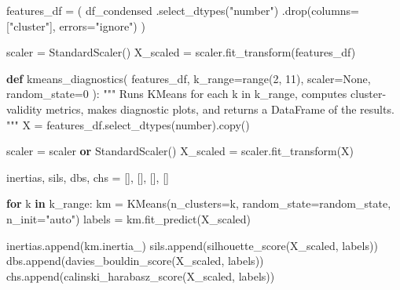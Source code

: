 \documentclass[
  letterpaper,
  DIV=11,
  numbers=noendperiod]{scrreprt}
\newenvironment{Shaded}{\begin{snugshade}}{\end{snugshade}}
\newcommand{\BuiltInTok}[1]{\textcolor[rgb]{0.00,0.23,0.31}{#1}}
\newcommand{\CommentTok}[1]{\textcolor[rgb]{0.37,0.37,0.37}{#1}}
\newcommand{\ControlFlowTok}[1]{\textcolor[rgb]{0.00,0.23,0.31}{\textbf{#1}}}
\newcommand{\DecValTok}[1]{\textcolor[rgb]{0.68,0.00,0.00}{#1}}
\newcommand{\KeywordTok}[1]{\textcolor[rgb]{0.00,0.23,0.31}{\textbf{#1}}}
\newcommand{\NormalTok}[1]{\textcolor[rgb]{0.00,0.23,0.31}{#1}}
\newcommand{\OperatorTok}[1]{\textcolor[rgb]{0.37,0.37,0.37}{#1}}
\newcommand{\StringTok}[1]{\textcolor[rgb]{0.13,0.47,0.30}{#1}}
\newcommand{\VariableTok}[1]{\textcolor[rgb]{0.07,0.07,0.07}{#1}}
\begin{document}
\begin{Shaded}
\begin{Highlighting}[]
\NormalTok{features\_df }\OperatorTok{=}\NormalTok{ (}
\NormalTok{    df\_condensed}
\NormalTok{    .select\_dtypes(}\StringTok{"number"}\NormalTok{)}
\NormalTok{    .drop(columns}\OperatorTok{=}\NormalTok{[}\StringTok{"cluster"}\NormalTok{], errors}\OperatorTok{=}\StringTok{"ignore"}\NormalTok{)}
\NormalTok{)}

\NormalTok{scaler }\OperatorTok{=}\NormalTok{ StandardScaler()}
\NormalTok{X\_scaled }\OperatorTok{=}\NormalTok{ scaler.fit\_transform(features\_df)}
\end{Highlighting}
\end{Shaded}

\begin{Shaded}
\begin{Highlighting}[]
\KeywordTok{def}\NormalTok{ kmeans\_diagnostics(}
\NormalTok{        features\_df,}
\NormalTok{        k\_range}\OperatorTok{=}\BuiltInTok{range}\NormalTok{(}\DecValTok{2}\NormalTok{, }\DecValTok{11}\NormalTok{),}
\NormalTok{        scaler}\OperatorTok{=}\VariableTok{None}\NormalTok{,}
\NormalTok{        random\_state}\OperatorTok{=}\DecValTok{0}
\NormalTok{    ):}
    \CommentTok{"""}
\CommentTok{    Runs KMeans for each k in k\_range, computes cluster{-}validity metrics,}
\CommentTok{    makes diagnostic plots, and returns a DataFrame of the results.}
\CommentTok{    """}
\NormalTok{    X }\OperatorTok{=}\NormalTok{ features\_df.select\_dtypes(}\StringTok{\textquotesingle{}number\textquotesingle{}}\NormalTok{).copy()}
    
\NormalTok{    scaler }\OperatorTok{=}\NormalTok{ scaler }\KeywordTok{or}\NormalTok{ StandardScaler()}
\NormalTok{    X\_scaled }\OperatorTok{=}\NormalTok{ scaler.fit\_transform(X)}

\NormalTok{    inertias, sils, dbs, chs }\OperatorTok{=}\NormalTok{ [], [], [], []}

    \ControlFlowTok{for}\NormalTok{ k }\KeywordTok{in}\NormalTok{ k\_range:}
\NormalTok{        km }\OperatorTok{=}\NormalTok{ KMeans(n\_clusters}\OperatorTok{=}\NormalTok{k, random\_state}\OperatorTok{=}\NormalTok{random\_state, n\_init}\OperatorTok{=}\StringTok{"auto"}\NormalTok{)}
\NormalTok{        labels }\OperatorTok{=}\NormalTok{ km.fit\_predict(X\_scaled)}

\NormalTok{        inertias.append(km.inertia\_)}
\NormalTok{        sils.append(silhouette\_score(X\_scaled, labels))}
\NormalTok{        dbs.append(davies\_bouldin\_score(X\_scaled, labels))}
\NormalTok{        chs.append(calinski\_harabasz\_score(X\_scaled, labels))}


\end{Highlighting}
\end{Shaded}
\end{document}
